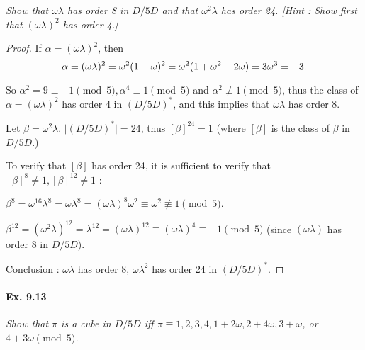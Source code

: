 \documentclass[11pt,a4paper]{article}
\begin{document}
{\it Show that $\omega \lambda$ has order 8 in $D/5D$ and that $\omega^2 \lambda$ has order 24. [Hint : Show first that $(\omega \lambda)^2$ has order 4.]
}

\begin{proof} If $\alpha = (\omega \lambda)^2$, then
$$\alpha = (\omega \lambda)^2 = \omega^2 (1-\omega)^2 = \omega^2(1 + \omega^2-2 \omega) = \-3\omega^3= -3.$$

So $\alpha^2 =9 \equiv -1\pmod 5, \alpha^4 \equiv 1 \pmod 5$ and $\alpha^2 \not \equiv 1 \pmod 5$, thus the class of $\alpha= (\omega \lambda)^2$ has order 4 in $(D/5D)^*$, and this implies that $\omega \lambda$ has order 8.

Let $\beta = \omega^2 \lambda$. $\vert (D/5 D)^* \vert = 24$, thus  $[\beta]^{24} = 1$ (where $[\beta]$ is the class of $\beta$ in $D/5D$.)

To verify that $[\beta]$ has order 24, it is sufficient to verify that $[\beta]^{8}\neq 1,[\beta]^{12}\neq 1$ :

$\beta^8 = \omega ^{16} \lambda^8 = \omega \lambda^8 = (\omega \lambda)^8 \omega^2 \equiv  \omega^2 \not \equiv 1 \pmod 5$.

$\beta^{12} = (\omega^2 \lambda)^{12} = \lambda^{12} = (\omega \lambda)^{12} \equiv  (\omega \lambda)^{4}  \equiv -1 \pmod 5$ (since $(\omega \lambda)$ has order 8 in $D/5D$).


Conclusion : $\omega \lambda$ has order 8, $\omega \lambda^2$ has order 24 in $(D/5D)^*$.
\end{proof}

\paragraph{Ex. 9.13}

{\it Show that $\pi$ is a cube in $D/5D$ iff $\pi \equiv 1,2,3,4,1+2\omega, 2 + 4\omega, 3 + \omega$, or $4+3\omega \pmod 5$.
}
\end{document}
